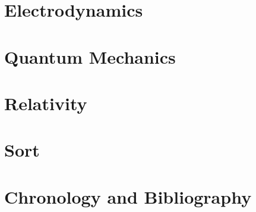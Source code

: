 \part{Electrodynamics}
   
   

\part{Quantum Mechanics}
   
   
   
   
   
   
   
   
   
   
   

\part{Relativity}
   
   
   
   
   
   
   
   
   

\part{Sort}
   
   
   
   
   

\part{Chronology and Bibliography}
   
